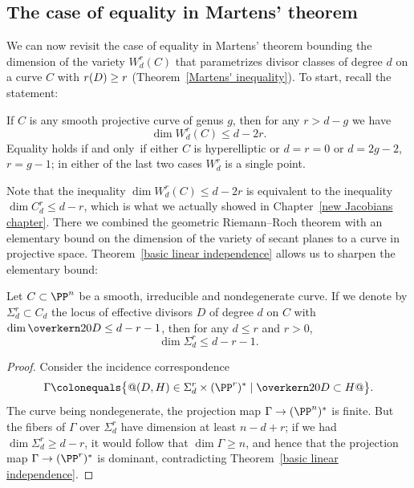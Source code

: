 \subsection*{The case of equality in Martens' theorem}

We can now revisit
the case
of equality in
%
Martens' theorem
bounding the dimension of the variety
$W^r_d(C)$
%
that parametrizes
divisor classes of degree $d$ on a curve $C$
with $r(D) \geq\nobreak r$
(Theorem~\ref{Martens' inequality}).
To start, recall the statement:

\begin{theorem}[Martens]\label{full Martens}
If $C$ is any smooth projective curve of genus $g$, then for any $r>d-g$
we have
$$
\dim W^r_d(C) \leq d-2r.
$$
Equality holds if and only~if either $C$ is
hyperelliptic
%
or $d=r=0$ or $d=2g-2$, $r=g-1$; in either of the last two cases $W^r_d$ is
a single point.
\unif
\end{theorem}

Note that the inequality $\dim W^r_d(C) \leq d-2r$ is equivalent to the
%
inequality $\dim
C^r_d
\leq d-r$, which is what we actually showed
in Chapter~\ref{new Jacobians chapter}. There we combined
the geometric Riemann--Roch theorem
%
with an elementary bound on the
dimension of the variety of secant planes to a curve in projective space.
Theorem~\ref{basic linear independence} allows us to sharpen the elementary bound:

\begin{lemma}\label{Strong secant plane lemma}
Let $C \subset \PP^n$ be a smooth, irreducible and nondegenerate curve. If
%
we denote by $
\Sigma^r_d
\subset C_d$ the locus of effective divisors
%
%
$D$ of degree $d$ on $C$ with $\dim \overkern20 D \leq d-r-1$, then for
any $d \leq r$ and $r > 0$,
$$
\dim \Sigma^r_d \leq d-r-1.
$$
\end{lemma}

\begin{proof}
Consider the incidence correspondence
$$
\Gamma \colonequals  \bigl\{@(D, H) \in \Sigma^r_d\times
(\PP^r)^*
\mid \overkern20 D \subset H@\bigr\}.
$$
The curve being nondegenerate, the projection map $\Gamma \to  (\PP^n)^*$
is finite. But the fibers of $\Gamma$ over $\Sigma^r_d$ have dimension
at least $n-d+r$; if we had $\dim \Sigma^r_d \geq d-r$, it would follow
that $\dim \Gamma \geq n$, and hence that the projection map $\Gamma
\to  (\PP^r)^*$ is dominant, contradicting Theorem~\ref{basic
linear independence}.
\end{proof}

